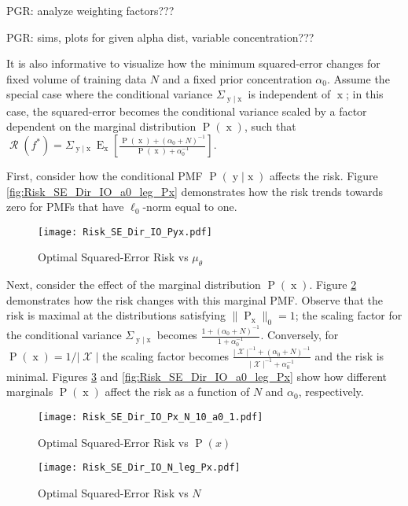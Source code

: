 \documentclass[12pt]{report}
\DeclareMathOperator{\xrm}{\mathrm{x}}
\DeclareMathOperator{\yrm}{\mathrm{y}}
\DeclareMathOperator{\Prm}{\mathrm{P}}
\DeclareMathOperator{\Erm}{\mathrm{E}}
\DeclareMathOperator{\Xcal}{\mathcal{X}}
\DeclareMathOperator{\Rcal}{\mathcal{R}}
\begin{document}
PGR: analyze weighting factors???

PGR: sims, plots for given alpha dist, variable concentration???

It is also informative to visualize how the minimum squared-error changes for fixed volume of training data $N$ and a fixed prior concentration $\alpha_0$. Assume the special case where the conditional variance $\Sigma_{\yrm | \xrm}$ is independent of $\xrm$; in this case, the squared-error becomes the conditional variance scaled by a factor dependent on the marginal distribution $\Prm(\xrm)$, such that $\Rcal(f^*) = \Sigma_{\yrm | \xrm} \Erm_{\xrm} \left[ \frac{\Prm(\xrm) + (\alpha_0+N)^{-1}}{\Prm(\xrm) + \alpha_0^{-1}} \right]$.

First, consider how the conditional PMF $\Prm(\yrm | \xrm)$ affects the risk. Figure \ref{fig:Risk_SE_Dir_IO_a0_leg_Px} demonstrates how the risk trends towards zero for PMFs that have $\ell_0$-norm equal to one.

\begin{figure}
\centering
\texttt{[image: Risk\_SE\_Dir\_IO\_Pyx.pdf]}
\caption{Optimal Squared-Error Risk vs $\mu_{\theta}$}
\label{fig:Risk_SE_Dir_IO_Pyx}
\end{figure}

Next, consider the effect of the marginal distribution $\Prm(\xrm)$. Figure \ref{fig:Risk_SE_Dir_IO_Px_N_10_a0_1} demonstrates how the risk changes with this marginal PMF. Observe that the risk is maximal at the distributions satisfying $\| \Prm_{\xrm} \|_0 = 1$; the scaling factor for the conditional variance $\Sigma_{\yrm | \xrm}$ becomes $\frac{1 + (\alpha_0+N)^{-1}}{1 + \alpha_0^{-1}}$. Conversely, for $\Prm(\xrm) = 1/|\Xcal|$ the scaling factor becomes $\frac{|\Xcal|^{-1} + (\alpha_0+N)^{-1}}{|\Xcal|^{-1} + \alpha_0^{-1}}$ and the risk is minimal. Figures \ref{fig:Risk_SE_Dir_IO_N_leg_Px} and \ref{fig:Risk_SE_Dir_IO_a0_leg_Px} show how different marginals $\Prm(\xrm)$ affect the risk as a function of $N$ and $\alpha_0$, respectively.

\begin{figure}
\centering
\texttt{[image: Risk\_SE\_Dir\_IO\_Px\_N\_10\_a0\_1.pdf]}
\caption{Optimal Squared-Error Risk vs $\Prm(x)$}
\label{fig:Risk_SE_Dir_IO_Px_N_10_a0_1}
\end{figure}

\begin{figure}
\centering
\texttt{[image: Risk\_SE\_Dir\_IO\_N\_leg\_Px.pdf]}
\caption{Optimal Squared-Error Risk vs $N$}
\label{fig:Risk_SE_Dir_IO_N_leg_Px}
\end{figure}
\end{document}
